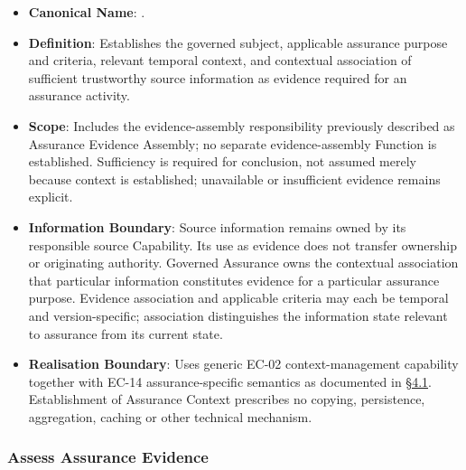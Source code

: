 \begin{itemize}

\item
\textbf{Canonical Name}: \texttt{}.



\item
\textbf{Definition}: Establishes the governed subject, applicable assurance purpose and criteria, relevant temporal context, and contextual association of sufficient trustworthy source information as evidence required for an assurance activity.



\item
\textbf{Scope}: Includes the evidence-assembly responsibility previously described as Assurance Evidence Assembly; no separate evidence-assembly Function is established. Sufficiency is required for conclusion, not assumed merely because context is established; unavailable or insufficient evidence remains explicit.



\item
\textbf{Information Boundary}: Source information remains owned by its responsible source Capability. Its use as evidence does not transfer ownership or originating authority. Governed Assurance owns the contextual association that particular information constitutes evidence for a particular assurance purpose. Evidence association and applicable criteria may each be temporal and version-specific; association distinguishes the information state relevant to assurance from its current state.



\item
\textbf{Realisation Boundary}: Uses generic EC-02 context-management capability together with EC-14 assurance-specific semantics as documented in \hyperref[rad:assurance:138]{§4.1}. Establishment of Assurance Context prescribes no copying, persistence, aggregation, caching or other technical mechanism.



\end{itemize}
\label{rad:assurance:106}



\label{rad:assurance:108}
\subsubsection*{Assess Assurance Evidence}
\label{rad:assurance:110}

